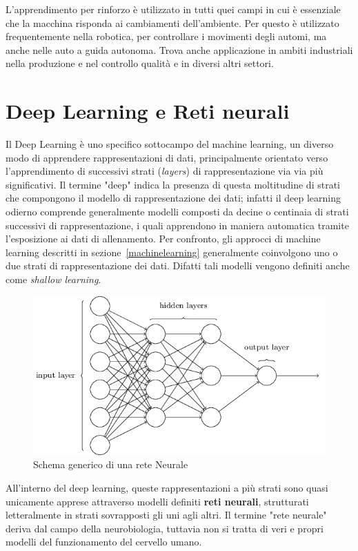 L'apprendimento per rinforzo è utilizzato in tutti quei campi in cui è essenziale che la macchina risponda ai cambiamenti dell'ambiente. Per questo è utilizzato frequentemente nella robotica, per controllare i movimenti degli automi, ma anche nelle auto a guida autonoma. Trova anche applicazione in ambiti industriali nella produzione e nel controllo qualità e in diversi altri settori.



\newpage
\section{Deep Learning e Reti neurali}
Il Deep Learning è uno specifico sottocampo del machine learning, un diverso modo di apprendere rappresentazioni di dati, principalmente orientato verso l'apprendimento di successivi strati (\textit{layers}) di rappresentazione via via più significativi. Il termine "deep" indica la presenza di questa moltitudine di strati che compongono il modello
di rappresentazione dei dati; infatti il deep learning odierno comprende generalmente modelli composti da decine o centinaia di strati successivi di rappresentazione, i quali apprendono in maniera automatica tramite l'esposizione ai dati di allenamento. Per confronto, gli approcci di machine learning descritti in sezione~\ref{machinelearning} generalmente coinvolgono uno o due strati di rappresentazione dei dati. Difatti tali modelli vengono definiti anche come \textit{shallow learning}.
 
\begin{figure}[htbp]
	\centering
	\includegraphics[width=\columnwidth]{figures/mlp-network.png}
	\caption{Schema generico di una rete Neurale \label{nn}}
\end{figure} 
 
All'interno del deep learning, queste rappresentazioni a più strati sono quasi unicamente apprese attraverso modelli definiti \textbf{reti neurali}, strutturati letteralmente in strati sovrapposti gli uni agli altri. Il termine "rete neurale" deriva dal campo della neurobiologia, tuttavia non si tratta di veri e propri modelli del funzionamento del cervello umano.

